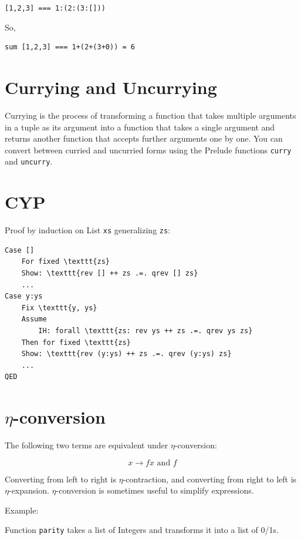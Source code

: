 \documentclass{article}
\begin{document}
\texttt{[1,2,3] === 1:(2:(3:[]))}

So,

\begin{lstlisting}[style=haskellstyle, caption=Haskell Code, label=code:haskell]
    sum [1,2,3] === 1+(2+(3+0)) = 6
\end{lstlisting}

\section{Currying and Uncurrying}

Currying is the process of transforming a function that takes multiple arguments in a tuple as its argument into a function that takes a single argument and returns another function that accepts further arguments one by one. You can convert between curried and uncurried forms using the Prelude functions \texttt{curry} and \texttt{uncurry}.

\section{CYP}

Proof by induction on List \texttt{xs} generalizing \texttt{zs}:

\begin{lstlisting}[style=mystyle, caption=Haskell Code, label=code:haskell]
    Case []
    For fixed \texttt{zs}
    Show: \texttt{rev [] ++ zs .=. qrev [] zs}
    ...
Case y:ys
    Fix \texttt{y, ys}
    Assume
        IH: forall \texttt{zs: rev ys ++ zs .=. qrev ys zs}
    Then for fixed \texttt{zs}
    Show: \texttt{rev (y:ys) ++ zs .=. qrev (y:ys) zs}
    ...
QED
\end{lstlisting}

\section{$\eta$-conversion}

The following two terms are equivalent under $\eta$-conversion:

\[
x \rightarrow f x \text{ and } f
\]

Converting from left to right is $\eta$-contraction, and converting from right to left is $\eta$-expansion. $\eta$-conversion is sometimes useful to simplify expressions.

Example:

Function \texttt{parity} takes a list of Integers and transforms it into a list of 0/1s.
\end{document}
